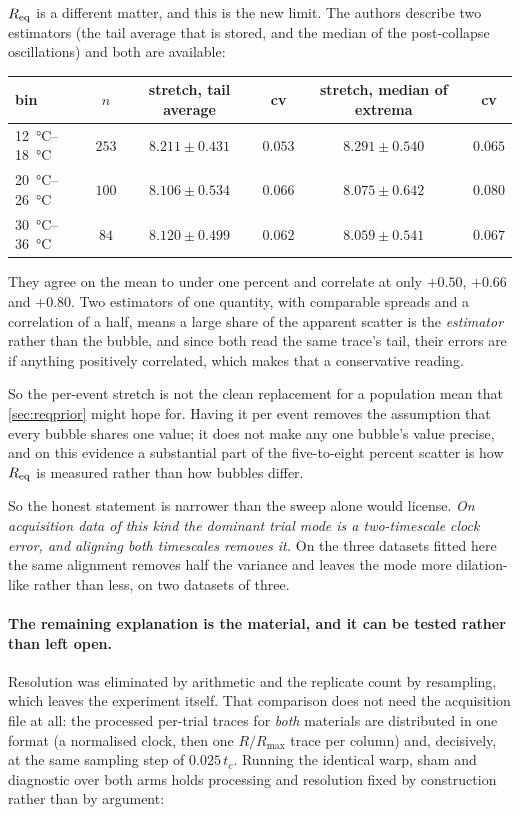 \documentclass[10pt]{article}
\begin{document}
$R_{\rm eq}$ is a different matter, and this is the new limit. The authors describe two
estimators (the tail average that is stored, and the median of the post-collapse oscillations) and both are available:

\begin{center}
\begin{tabular}{lccccc}
\toprule
bin & $n$ & stretch, tail average & cv & stretch, median of extrema & cv \\
\midrule
\SIrange{12}{18}{\celsius} & $253$ & $8.211 \pm 0.431$ & $0.053$ & $8.291 \pm 0.540$ & $0.065$ \\
\SIrange{20}{26}{\celsius} & $100$ & $8.106 \pm 0.534$ & $0.066$ & $8.075 \pm 0.642$ & $0.080$ \\
\SIrange{30}{36}{\celsius} & $84$ & $8.120 \pm 0.499$ & $0.062$ & $8.059 \pm 0.541$ & $0.067$ \\
\bottomrule
\end{tabular}
\end{center}

\noindent They agree on the mean to under one percent and correlate at only $+0.50$, $+0.66$ and
$+0.80$. Two estimators of one quantity, with comparable spreads and a correlation of a half,
means a large share of the apparent scatter is the \emph{estimator} rather than the bubble, and
since both read the same trace's tail, their errors are if anything positively correlated, which
makes that a conservative reading.

So the per-event stretch is not the clean replacement for a population mean that
\cref{sec:reqprior} might hope for. Having it per event removes the assumption that every bubble
shares one value; it does not make any one bubble's value precise, and on this evidence a
substantial part of the five-to-eight percent scatter is how $R_{\rm eq}$ is measured rather than
how bubbles differ.

So the honest statement is narrower than the sweep alone would license. \emph{On acquisition data
of this kind the dominant trial mode is a two-timescale clock error, and aligning both timescales
removes it.} On the three datasets fitted here the same alignment removes half the variance and
leaves the mode more dilation-like rather than less, on two datasets of three.

\paragraph{The remaining explanation is the material, and it can be tested rather than left
open.} Resolution was eliminated by arithmetic and the replicate count by resampling, which
leaves the experiment itself. That comparison does not need the acquisition file at all: the
processed per-trial traces for \emph{both} materials are distributed in one format (a
normalised clock, then one $R/R_{\max}$ trace per column) and, decisively, at the same
sampling step of $0.025\,t_c$. Running the identical warp, sham and diagnostic over both arms
holds processing and resolution fixed by construction rather than by argument:
\end{document}
